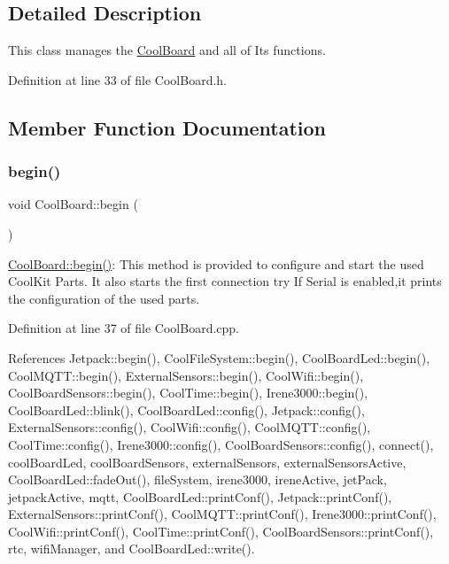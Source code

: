 \subsection{Detailed Description}
This class manages the \hyperlink{classCoolBoard}{Cool\+Board} and all of Its functions. 

Definition at line 33 of file Cool\+Board.\+h.



\subsection{Member Function Documentation}
\mbox{\label{classCoolBoard_acba7c5aef7268b2c0044bdb54d3b9d76}} 
\subsubsection{\texorpdfstring{begin()}{begin()}}
{\footnotesize\ttfamily void Cool\+Board\+::begin (\begin{DoxyParamCaption}{ }\end{DoxyParamCaption})}

\hyperlink{classCoolBoard_acba7c5aef7268b2c0044bdb54d3b9d76}{Cool\+Board\+::begin()}\+: This method is provided to configure and start the used Cool\+Kit Parts. It also starts the first connection try If Serial is enabled,it prints the configuration of the used parts. 

Definition at line 37 of file Cool\+Board.\+cpp.



References Jetpack\+::begin(), Cool\+File\+System\+::begin(), Cool\+Board\+Led\+::begin(), Cool\+M\+Q\+T\+T\+::begin(), External\+Sensors\+::begin(), Cool\+Wifi\+::begin(), Cool\+Board\+Sensors\+::begin(), Cool\+Time\+::begin(), Irene3000\+::begin(), Cool\+Board\+Led\+::blink(), Cool\+Board\+Led\+::config(), Jetpack\+::config(), External\+Sensors\+::config(), Cool\+Wifi\+::config(), Cool\+M\+Q\+T\+T\+::config(), Cool\+Time\+::config(), Irene3000\+::config(), Cool\+Board\+Sensors\+::config(), connect(), cool\+Board\+Led, cool\+Board\+Sensors, external\+Sensors, external\+Sensors\+Active, Cool\+Board\+Led\+::fade\+Out(), file\+System, irene3000, irene\+Active, jet\+Pack, jetpack\+Active, mqtt, Cool\+Board\+Led\+::print\+Conf(), Jetpack\+::print\+Conf(), External\+Sensors\+::print\+Conf(), Cool\+M\+Q\+T\+T\+::print\+Conf(), Irene3000\+::print\+Conf(), Cool\+Wifi\+::print\+Conf(), Cool\+Time\+::print\+Conf(), Cool\+Board\+Sensors\+::print\+Conf(), rtc, wifi\+Manager, and Cool\+Board\+Led\+::write().


